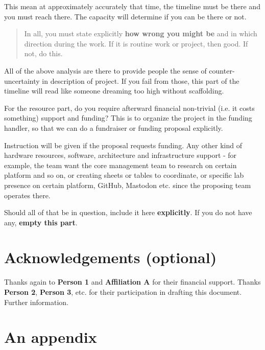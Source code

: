 \documentclass[10pt,a4paper]{article}
\begin{document}
This mean at approximately accurately that time, the timeline must be there and you must reach there. The capacity will determine if you can be there or not. 

\begin{quote}
    In all, you must state explicitly \textbf{how wrong you might be} and in which direction during the work. If it is routine work or project, then good. If not, do this. 
\end{quote}

All of the above analysis are there to provide people the sense of counter-uncertainty in description of project. If you fail from those, this part of the timeline will read like someone dreaming too high without scaffolding. 

For the resource part, do you require afterward financial non-trivial (i.e. it costs something) support and funding? This is to organize the project in the funding handler, so that we can do a fundraiser or funding proposal explicitly. 

Instruction will be given if the proposal requests funding. Any other kind of hardware resources, software, architecture and infrastructure support - for example, the team want the core management team to research on certain platform and so on, or creating sheets or tables to coordinate, or specific lab presence on certain platform, GitHub, Mastodon etc. since the proposing team operates there. 

Should all of that be in question, include it here \textbf{explicitly}. If you do not have any, \textbf{empty this part}. 

\section*{Acknowledgements (optional)}

Thanks again to \textbf{Person 1} and \textbf{Affiliation A} for their financial support. Thanks \textbf{Person 2}, \textbf{Person 3}, etc. for their participation in drafting this document. Further information. 


% 
% 

\appendix

\section{An appendix}
\end{document}
